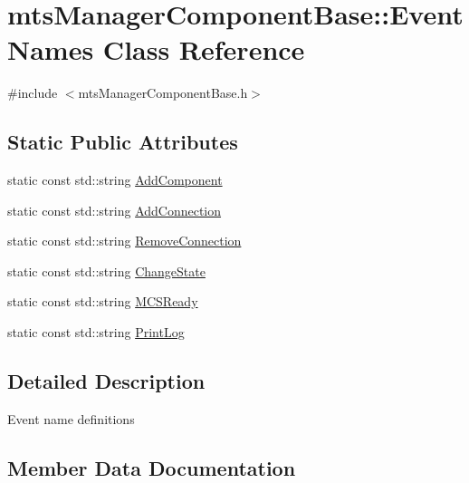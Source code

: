 \hypertarget{classmts_manager_component_base_1_1_event_names}{}\section{mts\+Manager\+Component\+Base\+:\+:Event\+Names Class Reference}
\label{classmts_manager_component_base_1_1_event_names}


{\ttfamily \#include $<$mts\+Manager\+Component\+Base.\+h$>$}

\subsection*{Static Public Attributes}
\begin{DoxyCompactItemize}
\item 
static const std\+::string \hyperlink{classmts_manager_component_base_1_1_event_names_affb24ff1ae3411f030019c2d8825ebb7}{Add\+Component}
\item 
static const std\+::string \hyperlink{classmts_manager_component_base_1_1_event_names_a58c86c23090fa30b77a4f1c021dfbdef}{Add\+Connection}
\item 
static const std\+::string \hyperlink{classmts_manager_component_base_1_1_event_names_a6ed5a8983b5fcaf54f4325330c05d42e}{Remove\+Connection}
\item 
static const std\+::string \hyperlink{classmts_manager_component_base_1_1_event_names_af360509da7183c9e77c4bf6c6cda9b2b}{Change\+State}
\item 
static const std\+::string \hyperlink{classmts_manager_component_base_1_1_event_names_a355cdd3ebdf92a00a01aca1ded79604f}{M\+C\+S\+Ready}
\item 
static const std\+::string \hyperlink{classmts_manager_component_base_1_1_event_names_aba75227480c71f9c9f841514b8799534}{Print\+Log}
\end{DoxyCompactItemize}


\subsection{Detailed Description}
Event name definitions 

\subsection{Member Data Documentation}
\hypertarget{classmts_manager_component_base_1_1_event_names_affb24ff1ae3411f030019c2d8825ebb7}{}
